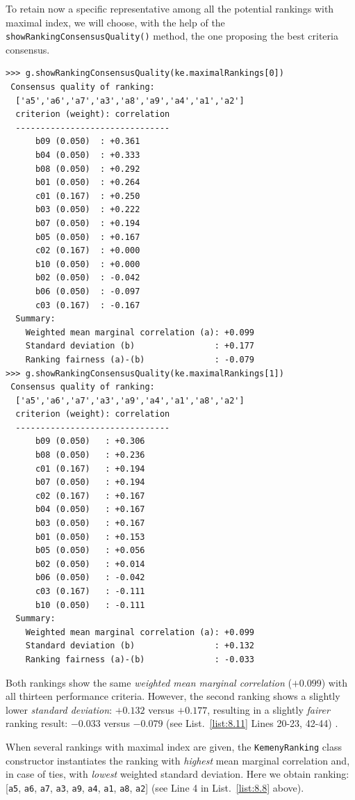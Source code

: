 To retain now a specific representative among all the potential rankings with maximal \Kemeny index, we will choose, with the help of the \texttt{showRankingConsensus\-Quality()} method, the one proposing the best criteria consensus.
\begin{lstlisting}[caption={Computing the consensus quality of a ranking},label=list:8.11]   
>>> g.showRankingConsensusQuality(ke.maximalRankings[0])
 Consensus quality of ranking:
  ['a5','a6','a7','a3','a8','a9','a4','a1','a2']
  criterion (weight): correlation
  -------------------------------
      b09 (0.050)  : +0.361
      b04 (0.050)  : +0.333
      b08 (0.050)  : +0.292
      b01 (0.050)  : +0.264
      c01 (0.167)  : +0.250
      b03 (0.050)  : +0.222
      b07 (0.050)  : +0.194
      b05 (0.050)  : +0.167
      c02 (0.167)  : +0.000
      b10 (0.050)  : +0.000
      b02 (0.050)  : -0.042
      b06 (0.050)  : -0.097
      c03 (0.167)  : -0.167
  Summary:
    Weighted mean marginal correlation (a): +0.099
    Standard deviation (b)                : +0.177
    Ranking fairness (a)-(b)              : -0.079
>>> g.showRankingConsensusQuality(ke.maximalRankings[1])
 Consensus quality of ranking:
  ['a5','a6','a7','a3','a9','a4','a1','a8','a2']
  criterion (weight): correlation
  -------------------------------
      b09 (0.050)   : +0.306
      b08 (0.050)   : +0.236
      c01 (0.167)   : +0.194
      b07 (0.050)   : +0.194
      c02 (0.167)   : +0.167
      b04 (0.050)   : +0.167
      b03 (0.050)   : +0.167
      b01 (0.050)   : +0.153
      b05 (0.050)   : +0.056
      b02 (0.050)   : +0.014
      b06 (0.050)   : -0.042
      c03 (0.167)   : -0.111
      b10 (0.050)   : -0.111
  Summary:
    Weighted mean marginal correlation (a): +0.099
    Standard deviation (b)                : +0.132
    Ranking fairness (a)-(b)              : -0.033
\end{lstlisting}

Both \Kemeny rankings show the same \emph{weighted mean marginal correlation} ($+0.099$) with all thirteen performance criteria. However, the second ranking shows a slightly lower \emph{standard deviation}: $+0.132$ versus $+0.177$, resulting in a slightly \emph{fairer} ranking result: $-0.033$ versus $-0.079$ (see List.~\vref{list:8.11} Lines 20-23, 42-44) .

When several rankings with maximal \Kemeny index are given, the \texttt{Kemeny\-Ranking} class constructor instantiates the ranking with \emph{highest} mean marginal correlation and, in case of ties, with \emph{lowest} weighted standard deviation. Here we obtain ranking: [\texttt{a5}, \texttt{a6}, \texttt{a7}, \texttt{a3}, \texttt{a9}, \texttt{a4}, \texttt{a1}, \texttt{a8}, \texttt{a2}] (see Line 4 in List.~\vref{list:8.8} above).

